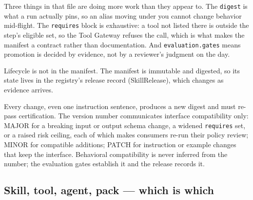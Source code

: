 Three things in that file are doing more work than they appear to. The \lstinline[style=bookinline]!digest! is what a run actually pins, so an alias moving under you cannot change behavior mid-flight. The \lstinline[style=bookinline]!requires! block is exhaustive: a tool not listed there is outside the step's eligible set, so the Tool Gateway refuses the call, which is what makes the manifest a contract rather than documentation. And \lstinline[style=bookinline]!evaluation.gates! means promotion is decided by evidence, not by a reviewer's judgment on the day.\par

Lifecycle is not in the manifest. The manifest is immutable and digested, so its state lives in the registry's release record (SkillRelease), which changes as evidence arrives.\par

Every change, even one instruction sentence, produces a new digest and must re-pass certification. The version number communicates interface compatibility only: MAJOR for a breaking input or output schema change, a widened \lstinline[style=bookinline]!requires! set, or a raised risk ceiling, each of which makes consumers re-run their policy review; MINOR for compatible additions; PATCH for instruction or example changes that keep the interface. Behavioral compatibility is never inferred from the number; the evaluation gates establish it and the release records it.\par

\subsection{Skill, tool, agent, pack — which is which}

